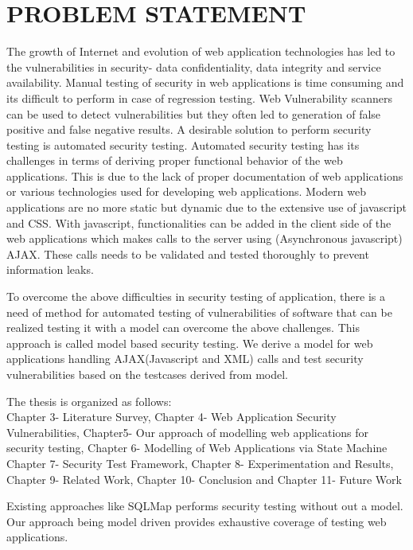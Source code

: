 
\chapter{PROBLEM STATEMENT}

The growth of Internet and evolution of web application technologies has led to the vulnerabilities in security- data confidentiality, data integrity and service availability. Manual testing of security in web applications is time consuming and its difficult to perform in case of regression testing. Web Vulnerability scanners can be used to detect vulnerabilities but they often led to generation of false positive and false negative results. A desirable solution to perform security testing is automated security testing. 
Automated security testing has its challenges in terms of deriving proper functional behavior of the web applications. This is due to the lack of proper documentation of web applications or various technologies used for developing web applications. Modern web applications are no more static but dynamic due to the extensive use of javascript and CSS. With javascript, functionalities can be added in the client side of the web applications which makes calls to the server using (Asynchronous javascript) AJAX. These calls needs to be validated and tested thoroughly to prevent information leaks. 

\newline
To overcome the above difficulties in security testing of application, there is a need of method for automated testing of vulnerabilities of software that can be realized testing it with a model can overcome the above challenges. This approach is called model based security testing. We derive a model for web applications handling AJAX(Javascript and XML) calls and test security vulnerabilities based on the testcases derived from model.

\newline
The thesis is organized as follows:\\
Chapter 3- Literature Survey, Chapter 4- Web Application Security Vulnerabilities, Chapter5- Our approach of modelling web applications for security testing, Chapter 6- Modelling of Web Applications via State Machine Chapter 7- Security Test Framework, Chapter 8- Experimentation and Results, Chapter 9- Related Work, Chapter 10- Conclusion and Chapter 11- Future Work

Existing approaches like SQLMap performs security testing without out a model. Our approach being model driven provides exhaustive coverage of testing web applications.
